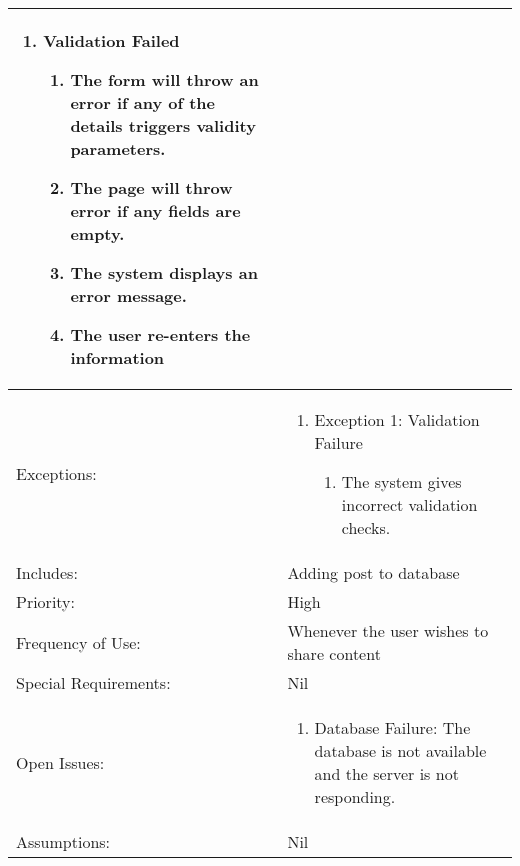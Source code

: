 \documentclass[12pt]{article}
\begin{document}
\begin{center}
\begin{longtable}{ | p{3cm} | p{3cm} | p{3cm} | p{3cm} | }
{\begin{enumerate}
                \item Validation Failed
                \begin{enumerate}
                    \item The form will throw an error if any of the details triggers validity parameters.  
                    \item The page will throw error if any fields are empty.
                    \item The system displays an error message.
                    \item The user re-enters the information
                \end{enumerate}
            \end{enumerate}
        }\\
        \hline
        Exceptions: & \multicolumn{3}{p{9cm}|}{
            \begin{enumerate}
                \item Exception 1: Validation Failure
                \begin{enumerate}
                    \item The system gives incorrect validation checks.
                \end{enumerate}
            \end{enumerate}
        }\\
        \hline
        Includes: & \multicolumn{3}{p{9cm}|}{Adding post to database}\\
        \hline
        Priority: & \multicolumn{3}{p{9cm}|}{High}\\
        \hline
        Frequency of Use: & \multicolumn{3}{p{9cm}|}{Whenever the user wishes to share content}\\
        \hline
        Special Requirements: & \multicolumn{3}{p{9cm}|}{Nil}\\
        \hline
        Open Issues: & \multicolumn{3}{p{9cm}|}{
            \begin{enumerate}
                \item Database Failure: The database is not available and the server is not responding.
            \end{enumerate}
        }\\
        \hline
        Assumptions:& \multicolumn{3}{p{9cm}|}{Nil}\\
        \hline
    \end{longtable}
\end{center}
\end{document}
